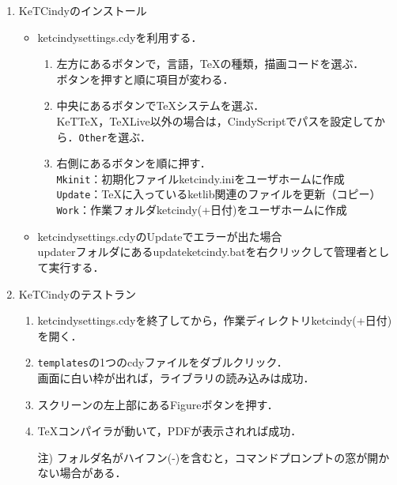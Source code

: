 \documentclass{ujarticle}
\begin{document}
\begin{enumerate}[\bf\large 1.]
\item KeTCindyのインストール
\begin{itemize}
\item ketcindysettings.cdyを利用する．
\begin{enumerate}[(1)]
\item 左方にあるボタンで，言語，TeXの種類，描画コードを選ぶ．\\
\hspace*{10mm}ボタンを押すと順に項目が変わる．
\item 中央にあるボタンでTeXシステムを選ぶ．\\
\hspace*{10mm}KeTTeX，TeXLive以外の場合は，CindyScriptでパスを設定してから．\verb|Other|を選ぶ．
\item 右側にあるボタンを順に押す．\\
\hspace*{10mm}\verb|Mkinit|：初期化ファイルketcindy.iniをユーザホームに作成\\
\hspace*{10mm}\verb|Update|：TeXに入っているketlib関連のファイルを更新（コピー）\\
\hspace*{10mm}\verb|Work|：作業フォルダketcindy(+日付)をユーザホームに作成
\end{enumerate}
\item ketcindysettings.cdyのUpdateでエラーが出た場合\\
\hspace*{10mm}updaterフォルダにあるupdateketcindy.batを右クリックして管理者として実行する．
\end{itemize}

\item KeTCindyのテストラン
    \begin{enumerate}[(1)]
    \item ketcindysettings.cdyを終了してから，作業ディレクトリketcindy(+日付)を開く．
    \item \verb|templates|の1つのcdyファイルをダブルクリック．\\
      \hspace*{10mm}画面に白い枠が出れば，ライブラリの読み込みは成功．
    \item スクリーンの左上部にあるFigureボタンを押す．
    \item \TeX コンパイラが動いて，PDFが表示されれば成功．
   \item[注)] フォルダ名がハイフン(-)を含むと，コマンドプロンプトの窓が開かない場合がある．
  \end{enumerate}


\end{enumerate}
\end{document}
